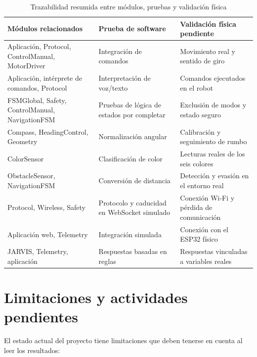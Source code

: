 \documentclass[journal]{IEEEtran}
\begin{document}
\begin{table}[t]
\centering
\caption{Trazabilidad resumida entre módulos, pruebas y validación física}
\label{tab:trazabilidad}
\scriptsize
\begin{tabular}{p{} p{} p{}}
\toprule
\textbf{Módulos relacionados} & \textbf{Prueba de software} & \textbf{Validación física pendiente} \\
\midrule
Aplicación, Protocol, ControlManual, MotorDriver & Integración de comandos & Movimiento real y sentido de giro \\
Aplicación, intérprete de comandos, Protocol & Interpretación de voz/texto & Comandos ejecutados en el robot \\
FSMGlobal, Safety, ControlManual, NavigationFSM & Pruebas de lógica de estados por completar & Exclusión de modos y estado seguro \\
Compass, HeadingControl, Geometry & Normalización angular & Calibración y seguimiento de rumbo \\
ColorSensor & Clasificación de color & Lecturas reales de los seis colores \\
ObstacleSensor, NavigationFSM & Conversión de distancia & Detección y evasión en el entorno real \\
Protocol, Wireless, Safety & Protocolo y caducidad en WebSocket simulado & Conexión Wi-Fi y pérdida de comunicación \\
Aplicación web, Telemetry & Integración simulada & Conexión con el ESP32 físico \\
JARVIS, Telemetry, aplicación & Respuestas basadas en reglas & Respuestas vinculadas a variables reales \\
\bottomrule
\end{tabular}
\end{table}


\section{Limitaciones y actividades pendientes}

El estado actual del proyecto tiene limitaciones que deben tenerse en cuenta al leer los resultados:
\end{document}
